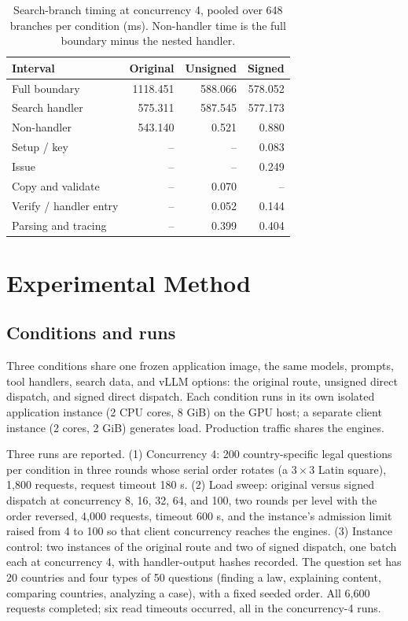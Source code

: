 \documentclass[paper]{ieice}
\begin{document}
\begin{table}[!htbp]
\caption{Search-branch timing at concurrency 4, pooled over 648 branches per condition (ms). Non-handler time is the full boundary minus the nested handler.}
\label{tab:boundary}
\centering\footnotesize
\setlength{\tabcolsep}{3pt}
\begin{tabular}{lrrr}
\toprule
Interval & Original & Unsigned & Signed\\
\midrule
Full boundary & 1118.451 & 588.066 & 578.052\\
Search handler & 575.311 & 587.545 & 577.173\\
Non-handler & 543.140 & 0.521 & 0.880\\
\midrule
Setup / key & -- & -- & 0.083\\
Issue & -- & -- & 0.249\\
Copy and validate & -- & 0.070 & --\\
Verify / handler entry & -- & 0.052 & 0.144\\
Parsing and tracing & -- & 0.399 & 0.404\\
\bottomrule
\end{tabular}
\end{table}

\section{Experimental Method}
\subsection{Conditions and runs}
Three conditions share one frozen application image, the same models, prompts, tool handlers, search data, and vLLM options: the original route, unsigned direct dispatch, and signed direct dispatch. Each condition runs in its own isolated application instance (2 CPU cores, 8 GiB) on the GPU host; a separate client instance (2 cores, 2 GiB) generates load. Production traffic shares the engines.

Three runs are reported. (1) Concurrency 4: 200 country-specific legal questions per condition in three rounds whose serial order rotates (a $3\times3$ Latin square), 1,800 requests, request timeout 180 s. (2) Load sweep: original versus signed dispatch at concurrency 8, 16, 32, 64, and 100, two rounds per level with the order reversed, 4,000 requests, timeout 600 s, and the instance's admission limit raised from 4 to 100 so that client concurrency reaches the engines. (3) Instance control: two instances of the original route and two of signed dispatch, one batch each at concurrency 4, with handler-output hashes recorded. The question set has 20 countries and four types of 50 questions (finding a law, explaining content, comparing countries, analyzing a case), with a fixed seeded order. All 6,600 requests completed; six read timeouts occurred, all in the concurrency-4 runs.
\end{document}
